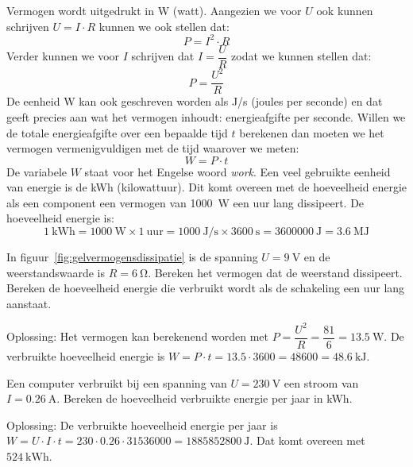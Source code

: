Vermogen wordt uitgedrukt in \si{\watt} (watt). Aangezien we voor $U$ ook kunnen schrijven $U=I\cdot R$
kunnen we ook stellen dat:
\begin{equation}
P = I^2\cdot R
\end{equation}
Verder kunnen we voor $I$ schrijven dat $I=\dfrac{U}{R}$ zodat we kunnen stellen dat:
\begin{equation}
P = \dfrac{U^2}{R}
\end{equation}
%
De eenheid \si{\watt} kan ook geschreven worden als \si[per-mode=symbol]{\joule\per\second} (joules per
seconde) en dat geeft precies aan wat het vermogen inhoudt: energieafgifte per seconde. Willen
we de totale energieafgifte over een bepaalde tijd $t$ berekenen dan moeten we het vermogen
vermenigvuldigen met de tijd waarover we meten:
%
\begin{equation}
W = P\cdot t
\end{equation}
%
De variabele $W$ staat voor het Engelse woord \textsl{work}. Een veel gebruikte eenheid van energie
is de \si{\kWh} (kilowattuur). Dit komt overeen met de hoeveelheid energie als een component een vermogen van
\SI{1000}{\watt} een uur lang dissipeert. De hoeveelheid energie is:
%
\begin{equation}
\SI{1}{\kWh} = \SI{1000}{\watt}  \times 1\ \mathrm{uur} = \SI{1000}{\joule\per\second} \times \SI{3600}{\second} = \SI{3600000}{\joule} = \SI{3.6}{\mega\joule}
\end{equation}
%
\begin{example}
In figuur~\ref{fig:gelvermogensdissipatie} is de spanning $U=\SI{9}{\volt}$ en de weerstandswaarde is
$R=\SI{6}{\ohm}$. Bereken het vermogen dat de weerstand dissipeert. Bereken de hoeveelheid energie die
verbruikt wordt als de schakeling een uur lang aanstaat.

Oplossing: Het vermogen kan berekenend worden met $P = \dfrac{U^2}{R} = \dfrac{81}{6} = \SI{13.5}{\watt}$.
De\\[1ex] verbruikte hoeveelheid energie is $W=P\cdot t = \num{13.5}\cdot\num{3600} = \num{48600} = \SI{48.6}{\kilo\joule}$.

Een computer verbruikt bij een spanning van $U=\SI{230}{\volt}$ een stroom van $I=\SI{0.26}{\ampere}$.
Bereken de hoeveelheid verbruikte energie per jaar in \si{\kWh}.

Oplossing: De verbruikte hoeveelheid energie per jaar is $W=U\cdot I\cdot t = \num{230}\cdot\num{0.26}\cdot\num{31536000}=\SI{1885852800}{\joule}$. Dat komt overeen met $\SI{524}{\kWh}$.
\end{example}


